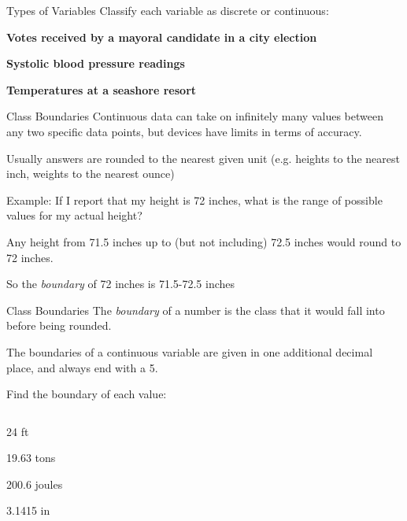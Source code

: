 \documentclass[t]{beamer}
\newcommand{\?}{\stackrel{?}{=}}
\begin{document}
	\begin{frame}{Types of Variables}
		Classify each variable as discrete or continuous:
		
		\textbf{Votes received by a mayoral candidate in a city election}
		
		
		\textbf{Systolic blood pressure readings}
		
		
		\textbf{Temperatures at a seashore resort}
		
	\end{frame}

	\begin{frame}{Class Boundaries}
		Continuous data can take on infinitely many values between any two specific data points, but devices have limits in terms of accuracy.
		
		Usually answers are rounded to the nearest given unit (e.g. heights to the nearest inch, weights to the nearest ounce) \pause
		
		Example: If I report that my height is 72 inches, what is the range of possible values for my actual height? \pause
		
		Any height from 71.5 inches up to (but not including) 72.5 inches would round to 72 inches.
		
		So the \textit{boundary} of 72 inches is 71.5-72.5 inches
	\end{frame}

	\begin{frame}{Class Boundaries}
		The \textit{boundary} of a number is the class that it would fall into before being rounded.
		
		The boundaries of a continuous variable are given in one additional decimal place, and always end with a 5.
		
		Find the boundary of each value:
		
		\begin{columns}
			\begin{column}{0.5\textwidth}
				24 ft
				
				19.63 tons
				
				200.6 joules
				
				3.1415 in
			\end{column}
			\begin{column}{0.5\textwidth}
				\onslide<2->{23.5-24.5 ft}
				
				
				
			\end{column}
		\end{columns}
	\end{frame}
\end{document}
